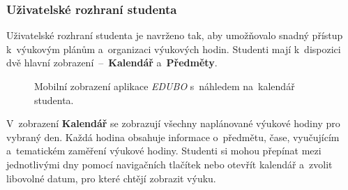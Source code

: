 \documentclass[male,czech,api_bc]{kitheses}
\begin{document}
\subsubsection{Uživatelské rozhraní studenta}

Uživatelské rozhraní studenta je navrženo tak, aby umožňovalo snadný přístup k~výukovým plánům a~organizaci výukových hodin. Studenti mají k~dispozici dvě hlavní zobrazení~--~\textbf{Kalendář} a~\textbf{Předměty}.

\begin{figure}[H]
	\centering
	\caption{Mobilní zobrazení aplikace \textit{EDUBO} s~náhledem na~kalendář studenta.}
	\label{fig:edubo-5}
\end{figure}

\newpage

V~zobrazení \textbf{Kalendář} se zobrazují všechny naplánované výukové hodiny pro vybraný den. Každá hodina obsahuje informace o~předmětu, čase, vyučujícím a~tematickém zaměření výukové hodiny. Studenti si mohou přepínat mezi jednotlivými dny pomocí navigačních tlačítek nebo otevřít kalendář a~zvolit libovolné datum, pro které chtějí zobrazit výuku.
\end{document}
